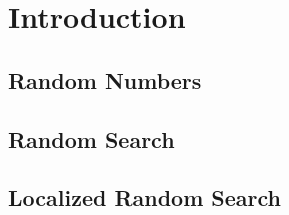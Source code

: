 \chapter{Introduction}
\label{chap:intro}



\section{Random Numbers}
\section{Random Search}
\section{Localized Random Search}
